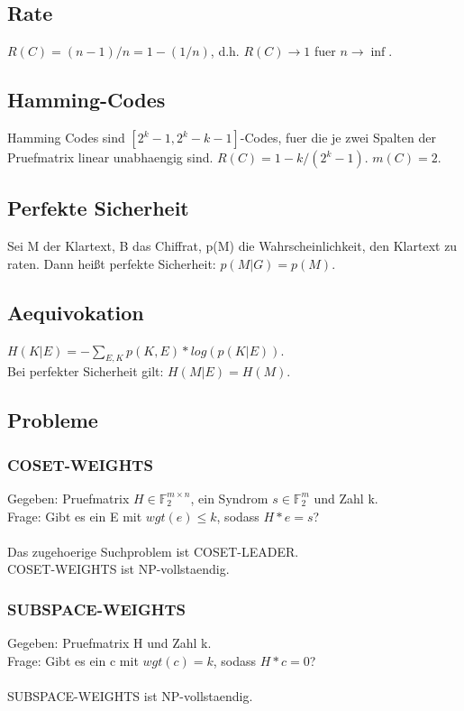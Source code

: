 \documentclass[a4paper]{scrreprt}
\begin{document}
\subsection{Rate}
$R(C) = (n-1)/n = 1-(1/n)$, d.h. $R(C) \rightarrow 1$ fuer $n \rightarrow \inf$.

\subsection{Hamming-Codes}
Hamming Codes sind $[2^k - 1, 2^k - k - 1]$-Codes, fuer die je zwei Spalten der Pruefmatrix linear unabhaengig sind.
$R(C) = 1-k/(2^k-1)$.
$m(C) = 2$.

\subsection{Perfekte Sicherheit}
Sei M der Klartext, B das Chiffrat, p(M) die Wahrscheinlichkeit, den Klartext zu raten. Dann heißt perfekte Sicherheit: $p(M|G) = p(M)$.

\subsection{Aequivokation}
$H(K|E) = -\sum_{E,K} p(K,E) * log(p(K|E))$.\\
Bei perfekter Sicherheit gilt: $H(M|E) = H(M)$.

\subsection{Probleme}
\subsubsection{COSET-WEIGHTS}
Gegeben: Pruefmatrix $H \in \mathbb{F}_2^{m \times n}$, ein Syndrom $s \in \mathbb{F}_2^m$ und Zahl k.\\
Frage: Gibt es ein E mit $wgt(e) \le k$, sodass $H*e = s$?\\\\
Das zugehoerige Suchproblem ist COSET-LEADER.\\
COSET-WEIGHTS ist NP-vollstaendig.
\subsubsection{SUBSPACE-WEIGHTS}
Gegeben: Pruefmatrix H und Zahl k.\\
Frage: Gibt es ein c mit $wgt(c) = k$, sodass $H*c = 0$?\\\\
SUBSPACE-WEIGHTS ist NP-vollstaendig.
\end{document}
